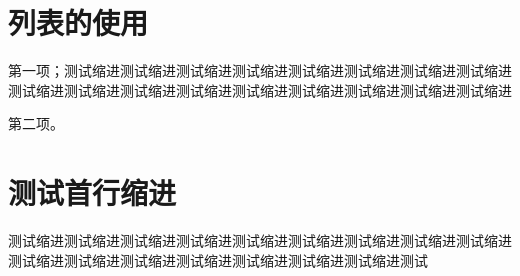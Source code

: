 \section{列表的使用}

\begin{asparaenum}[（1）]
    \item 第一项；测试缩进测试缩进测试缩进测试缩进测试缩进测试缩进测试缩进测试缩进测试缩进测试缩进测试缩进测试缩进测试缩进测试缩进测试缩进测试缩进测试缩进
    \item 第二项。
\end{asparaenum}

\section{测试首行缩进}

测试缩进测试缩进测试缩进测试缩进测试缩进测试缩进测试缩进测试缩进测试缩进测试缩进测试缩进测试缩进测试缩进测试缩进测试缩进测试缩进测试


\let\cleardoublepage\clearpage



